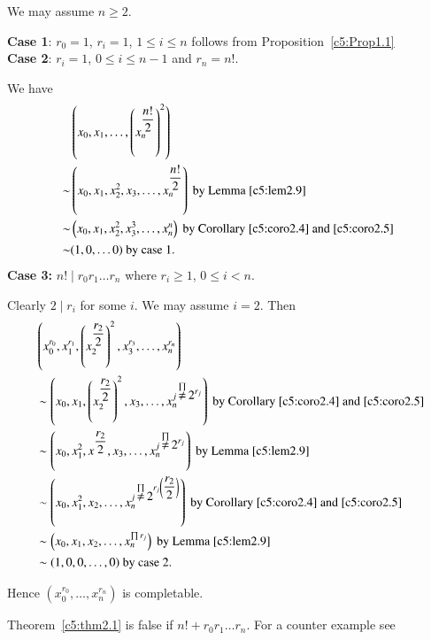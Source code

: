 \begin{PRF1}
We may assume $n\geq 2$. 

\textbf{Case 1}: $r_0=1$, $r_i=1$, $1\leq i\leq n$ follows from
Proposition~\ref{c5:Prop1.1}\\
\quad\textbf{Case 2}: $r_i=1$, $0\leq i\leq n-1$ and $r_n=n!$.

We have
$$
\begin{aligned}
&\left(x_0,x_1,\ldots,\left(x_{n}^{\dfrac{n!}{2}}\right)^{2}\right)\\
\sim&{}\left(x_0,x_1,x^{2}_2,x_3,\ldots,x^{\dfrac{n!}{2}}_n\right)\text{ by Lemma~\ref{c5:lem2.9} }\\
\sim&{}\left(x_0,x_1,x^{2}_2,x^{3}_3,\ldots,x^{n}_n\right) \text{ by
  Corollary~\ref{c5:coro2.4} and \ref{c5:coro2.5} }\\
\sim&{} (1,0,\ldots 0)\text{ by case 1. }
\end{aligned}
$$
\textbf{Case 3:} $n!\mid r_0r_1\ldots r_n$ where $r_i\geq 1$, $0\leq
i<n$. 

Clearly $2\mid r_i$ for some $i$. We may assume $i=2$. Then 
$$
\begin{aligned}
&\left(x^{r_0}_0,x^{r_1}_1,\left(x_2^{\dfrac{r_{2}}{2}}\right)^{2},x^{r_3}_3,\ldots,
  x^{r_n}_n\right)\\
&{}\sim\left(x_0,x_1,\left(x_{2}^{\dfrac{r_2}{2}}\right)^{2},x_3,\ldots,
  x_n^{j\displaystyle\mathop{\neq}^{\prod}2^{r_j}}\right) \text{ by
  Corollary~\ref{c5:coro2.4} and \ref{c5:coro2.5}}\\
&{}\sim\left(x_0,x^{2}_1,x^{\dfrac{r_2}{2}},x_3,\ldots,
  x_n^{j\displaystyle\mathop{\neq}^{\prod}2^{r_j}}\right) \text{ by
  Lemma~\ref{c5:lem2.9} }\\
&{}\sim \left(x_0,x^{2}_1,x_2,\ldots,
  x_n^{j\displaystyle\mathop{\neq}^{\prod}2^{r_j\left(\dfrac{r_2}{2}\right)}}\right) \text{ by
  Corollary~\ref{c5:coro2.4} and \ref{c5:coro2.5}}\\
&{}\sim \left(x_0,x_1,x_2,\ldots,x_n^{\prod r_j}\right) \text{ by
  Lemma~\ref{c5:lem2.9} }\\
&{}\sim(1,0,0,\ldots,0) \text{ by case 2. }
\end{aligned}
$$

Hence $\left(x^{r_0}_0,\ldots,x^{r_n}_n\right)$ is completable.
\end{PRF1}

\begin{rem}\label{c5:rem2.10}
Theorem~\ref{c5:thm2.1} is false if $n!+r_0r_1\ldots r_n$. For a
counter example see \cite{Swan}
\end{rem}
